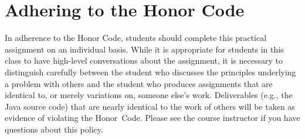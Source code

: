 \documentclass[11pt]{article}
\begin{document}
\section*{Adhering to the Honor Code}

In adherence to the Honor Code, students should complete this practical assignment on an individual basis. While it is
appropriate for students in this class to have high-level conversations about the assignment, it is necessary to
distinguish carefully between the student who discusses the principles underlying a problem with others and the student
who produces assignments that are identical to, or merely variations on, someone else's work. Deliverables (e.g., the
Java source code) that are nearly identical to the work of others will be taken as evidence of violating the \mbox{Honor
Code}. Please see the course instructor if you have questions about this policy.
\end{document}

